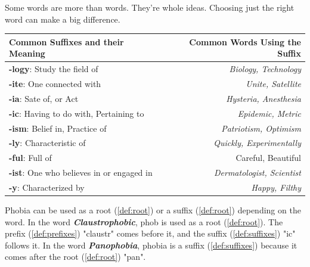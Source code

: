 Some words are more than words. They're whole ideas. Choosing just the right
word can make a big difference.

\begin{center}
    \begin{tabular}{|l|r|}
      \hline
      \textbf{Common Suffixes and their Meaning} & \textbf{Common Words Using the Suffix} \\
      \hline
      \textbf{-logy}: Study the field of & \textit{Biology, Technology} \\
      \hline
      \textbf{-ite}: One connected with & \textit{Unite, Satellite} \\
      \hline
      \textbf{-ia}: Sate of, or Act & \textit{Hysteria, Anesthesia} \\
      \hline
      \textbf{-ic}: Having to do with, Pertaining to & \textit{Epidemic, Metric} \\
      \hline
      \textbf{-ism}: Belief in, Practice of & \textit{Patriotism, Optimism} \\
      \hline
      \textbf{-ly}: Characteristic of & \textit{Quickly, Experimentally} \\
      \hline
      \textbf{-ful}: Full of & Careful, Beautiful \\
      \hline
      \textbf{-ist}: One who believes in or engaged in & \textit{Dermatologist, Scientist} \\
      \hline
      \textbf{-y}: Characterized by & \textit{Happy, Filthy} \\
      \hline
    \end{tabular}
\end{center}

Phobia can be used as a root (\ref{def:root}) or a suffix (\ref{def:root})
depending on the word. In the word \textbf{\textit{Claustrophobic}}, phob is
used as a root (\ref{def:root}). The prefix (\ref{def:prefixes}) "claustr" comes
before it, and the suffix (\ref{def:suffixes}) "ic" follows it. In the word
\textbf{\textit{Panophobia}}, phobia is a suffix (\ref{def:suffixes}) because it
comes after the root (\ref{def:root}) "pan".


\newpage

